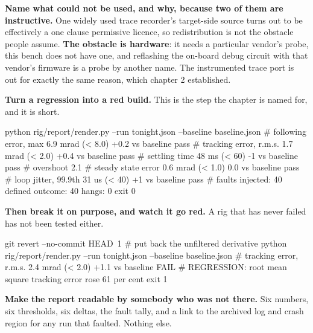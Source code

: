 \begin{steps}
\item \textbf{Name what could not be used, and why, because two of them are
instructive.} One widely used trace recorder's target-side source turns out to be
effectively a one clause permissive licence, so redistribution is not the
obstacle people assume. \textbf{The obstacle is hardware}: it needs a particular
vendor's probe, this bench does not have one, and reflashing the on-board debug
circuit with that vendor's firmware is a probe by another name. The instrumented
trace port is out for exactly the same reason, which chapter 2 established.

\item \textbf{Turn a regression into a red build.} This is the step the chapter
is named for, and it is short.
\begin{shellcode}
python rig/report/render.py --run tonight.json --baseline baseline.json
# following error, max      6.9 mrad   (< 8.0)    +0.2 vs baseline   pass
# tracking error, r.m.s.    1.7 mrad   (< 2.0)    +0.4 vs baseline   pass
# settling time              48 ms     (< 60)      -1  vs baseline   pass
# overshoot                 2.1 %
# steady state error        0.6 mrad   (< 1.0)     0.0 vs baseline   pass
# loop jitter, 99.9th        31 us     (< 40)      +1  vs baseline   pass
# faults injected: 40   defined outcome: 40   hangs: 0
exit 0
\end{shellcode}

\item \textbf{Then break it on purpose, and watch it go red.} A rig that has
never failed has not been tested either.
\begin{shellcode}
git revert --no-commit HEAD~1      # put back the unfiltered derivative
python rig/report/render.py --run tonight.json --baseline baseline.json
# tracking error, r.m.s.    2.4 mrad   (< 2.0)    +1.1 vs baseline   FAIL
# REGRESSION: root mean square tracking error rose 61 per cent
exit 1
\end{shellcode}

\item \textbf{Make the report readable by somebody who was not there.} Six
numbers, six thresholds, six deltas, the fault tally, and a link to the archived
log and crash region for any run that faulted. Nothing else.
\end{steps}


